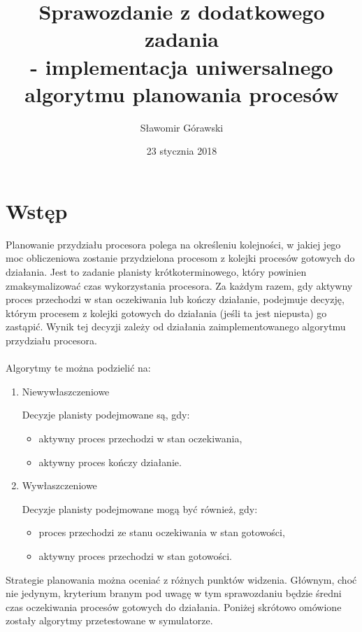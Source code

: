 \documentclass{article}
\title{Sprawozdanie z dodatkowego zadania\\ - implementacja uniwersalnego algorytmu planowania procesów}
\author{Sławomir Górawski}
\date{23 stycznia 2018}
\begin{document}
\maketitle

\section{Wstęp}

Planowanie przydziału procesora polega na określeniu kolejności,
w jakiej jego moc obliczeniowa zostanie przydzielona procesom z kolejki procesów gotowych do działania.
Jest to zadanie planisty krótkoterminowego,
który powinien zmaksymalizować czas wykorzystania procesora.
Za każdym razem, gdy aktywny proces przechodzi w stan oczekiwania lub kończy działanie,
podejmuje decyzję, którym procesem z kolejki gotowych do działania (jeśli ta jest niepusta) go zastąpić.
Wynik tej decyzji zależy od działania zaimplementowanego algorytmu przydziału procesora.
\\
\\
Algorytmy te można podzielić na:

\begin{enumerate}
    \item Niewywłaszczeniowe

    Decyzje planisty podejmowane są, gdy:
    \begin{itemize}
        \item aktywny proces przechodzi w stan oczekiwania,
        \item aktywny proces kończy działanie.
    \end{itemize}

    \item Wywłaszczeniowe

    Decyzje planisty podejmowane mogą być również, gdy:
    \begin{itemize}
        \item proces przechodzi ze stanu oczekiwania w stan gotowości,
        \item aktywny proces przechodzi w stan gotowości.
    \end{itemize}
\end{enumerate}

Strategie planowania można oceniać z różnych punktów widzenia.
Głównym, choć nie jedynym,
kryterium branym pod uwagę w tym sprawozdaniu będzie średni czas oczekiwania procesów gotowych do działania.
Poniżej skrótowo omówione zostały algorytmy przetestowane w symulatorze.
\end{document}
